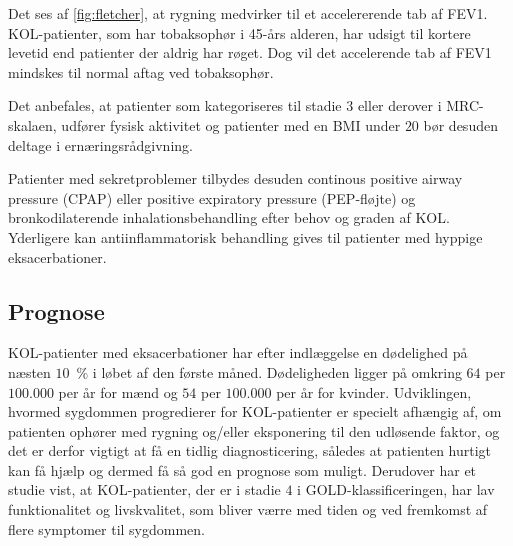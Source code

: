 \noindent
Det ses af \autoref{fig:fletcher}, at rygning medvirker til et accelererende tab af FEV1. KOL-patienter, som har tobaksophør i 45-års alderen, har udsigt til kortere levetid end patienter der aldrig har røget. Dog vil det accelerende tab af FEV1 mindskes til normal aftag ved tobaksophør.\cite{dsam2016}

Det anbefales, at patienter som kategoriseres til stadie $3$ eller derover i MRC-skalaen, udfører fysisk aktivitet og patienter med en BMI under $ 20$ bør desuden deltage i ernæringsrådgivning. 

Patienter med sekretproblemer tilbydes desuden continous positive airway pressure (CPAP) eller positive expiratory pressure (PEP-fløjte) og bronkodilaterende inhalationsbehandling efter behov og graden af KOL. Yderligere kan antiinflammatorisk behandling gives til patienter med hyppige eksacerbationer. \cite{Basisbogen2016}
 
 
\subsection{Prognose}
KOL-patienter med eksacerbationer har efter indlæggelse en dødelighed på næsten $10$~$\%$ i løbet af den første måned. Dødeligheden ligger på omkring $64$ per $100.000$ per år for mænd og $54$ per $100.000$ per år for kvinder.
Udviklingen, hvormed sygdommen progredierer for KOL-patienter er specielt afhængig af, om patienten ophører med rygning og/eller eksponering til den udløsende faktor, og det er derfor vigtigt at få en tidlig diagnosticering, således at patienten hurtigt kan få hjælp og dermed få så god en prognose som muligt. \cite{dsam2016}
Derudover har et studie vist, at KOL-patienter, der er i stadie $4$ i GOLD-klassificeringen, har lav funktionalitet og livskvalitet, som bliver værre med tiden og ved fremkomst af flere symptomer til sygdommen. \cite{Habraken2011}

